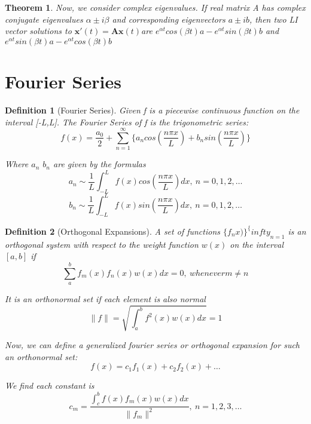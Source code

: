 \documentclass[12pt]{report}
\newtheorem{thm}{Theorem}
\newtheorem{dfn}{Definition}
\newcommand{\difeq}{$\mathbf{x}'(t)=\mathbf{Ax}(t)$}
\begin{document}
\begin{thm}
Now, we consider complex eigenvalues. If real matrix A has complex conjugate eigenvalues $\alpha \pm i\beta$ and corresponding eigenvectors $a\pm ib$, then two LI vector solutions to \difeq are $e^{\alpha t}cos(\beta t)a-e^{\alpha t}sin(\beta t)b$ and $e^{\alpha t}sin(\beta t)a-e^{\alpha t}cos(\beta t)b$
\end{thm}

\section{Fourier Series}

\begin{dfn}[Fourier Series]
Given f is a piecewise continuous function on the interval [-L,L]. The Fourier Series of f is the trigonometric series:
\begin{equation}
f(x)=\frac{a_0}{2}+\sum_{n=1}^{\infty}\{a_ncos(\frac{n\pi x}{L})+b_nsin(\frac{n\pi x}{L})\}
\end{equation}

Where $a_n$ $b_n$ are given by the formulas
\begin{equation}
a_n\sim\frac{1}{L}\int_{-L}^{L}f(x)cos(\frac{n\pi x}{L})dx, \: n=0,1,2,\ldots
\end{equation}
\begin{equation}
b_n\sim\frac{1}{L}\int_{-L}^{L}f(x)sin(\frac{n\pi x}{L})dx, \: n=0,1,2,\ldots
\end{equation}

\end{dfn}

\begin{dfn}[Orthogonal Expansions]
A set of functions $\{f_n{x)\}^\{infty}_{n=1}$ is an orthogonal system with respect to the weight function $w(x)$ on the interval $[a,b]$ if
\begin{equation}
\sum_a^b f_m(x)f_n(x)w(x)dx=0, \: whenever m\neq n
\end{equation}

It is an orthonormal set if each element is also normal
\begin{equation}
\|f\| = \sqrt{\int_a^b f^2(x)w(x)dx}=1
\end{equation}

Now, we can define a generalized fourier series or orthogonal expansion for such an orthonormal set:
\begin{equation}
f(x)=c_1f_1(x)+c_2f_2(x)+\ldots
\end{equation}

We find each constant is
\begin{equation}
c_m = \frac{\int_c^b f(x)f_m(x)w(x)dx}{\|f_m\|^2}, \: n=1,2,3,\ldots
\end{equation}
\end{dfn}
\end{document}
